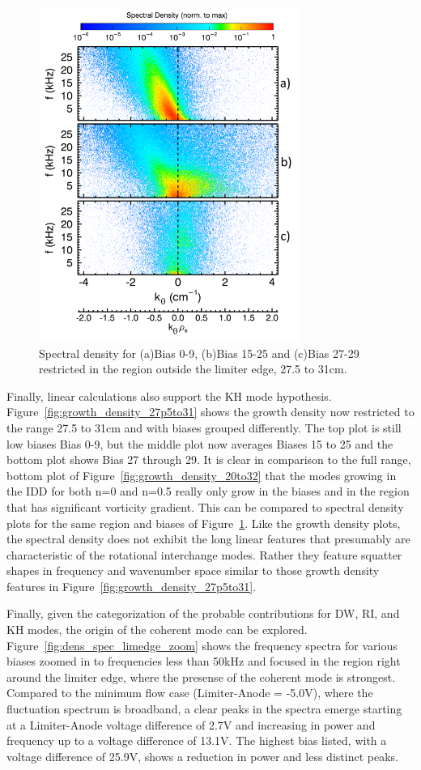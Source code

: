 \documentclass[aip,pop,amsmath,amssymb,reprint,superscriptaddress]{revtex4-1} %
\begin{document}
\begin{figure}[!htbp]
\centerline{
\includegraphics[width=8.5cm]{k_spec_KH_lab}}%
\caption{\label{fig:k_spec_KH} Spectral density for (a)Bias 0-9, (b)Bias 15-25 and (c)Bias 27-29 restricted in the region outside the limiter edge, 27.5 to 31cm.}
\end{figure}

Finally, linear calculations also support the KH mode hypothesis. Figure~\ref{fig:growth_density_27p5to31} shows the growth density now restricted to the range 27.5 to 31cm and with biases grouped differently. The top plot is still low biases Bias 0-9, but the middle plot now averages Biases 15 to 25 and the bottom plot shows Bias 27 through 29. It is clear in comparison to the full range, bottom plot of Figure~\ref{fig:growth_density_20to32} that the modes growing in the IDD for both n=0 and n=0.5 really only grow in the biases and in the region that has significant vorticity gradient. This can be compared to spectral density plots for the same region and biases of Figure~\ref{fig:k_spec_KH}. Like the growth density plots, the spectral density does not exhibit the long linear features that presumably are characteristic of the rotational interchange modes. Rather they feature squatter shapes in frequency and wavenumber space similar to those growth density features in Figure~\ref{fig:growth_density_27p5to31}.

Finally, given the categorization of the probable contributions for DW, RI, and KH modes, the origin of the coherent mode can be explored. Figure~\ref{fig:dens_spec_limedge_zoom} shows the frequency spectra for various biases zoomed in to frequencies less than 50kHz and focused in the region right around the limiter edge, where the presense of the coherent mode is strongest. Compared to the minimum flow case (Limiter-Anode = -5.0V), where the fluctuation spectrum is broadband, a clear peaks in the spectra emerge starting at a Limiter-Anode voltage difference of 2.7V and increasing in power and frequency up to a voltage difference of 13.1V. The highest bias listed, with a voltage difference of 25.9V, shows a reduction in power and less distinct peaks.
\end{document}
